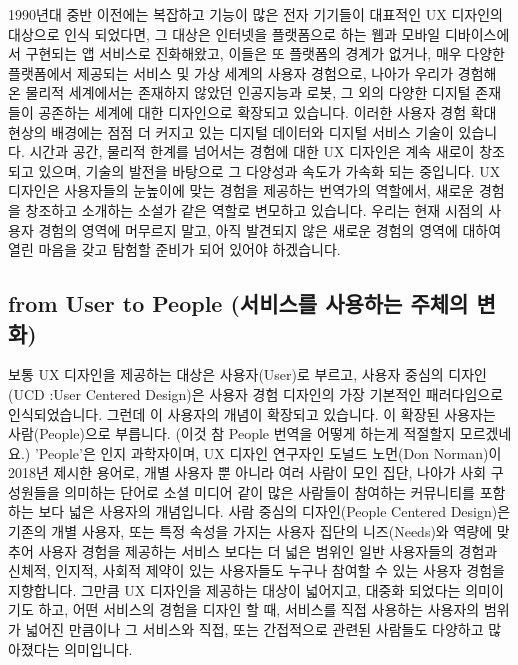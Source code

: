 \documentclass[
  letterpaper,
  DIV=11,
  numbers=noendperiod]{scrreprt}
\begin{document}
1990년대 중반 이전에는 복잡하고 기능이 많은 전자 기기들이 대표적인 UX
디자인의 대상으로 인식 되었다면, 그 대상은 인터넷을 플랫폼으로 하는 웹과
모바일 디바이스에서 구현되는 앱 서비스로 진화해왔고, 이들은 또 플랫폼의
경계가 없거나, 매우 다양한 플랫폼에서 제공되는 서비스 및 가상 세계의
사용자 경험으로, 나아가 우리가 경험해 온 물리적 세계에서는 존재하지
않았던 인공지능과 로봇, 그 외의 다양한 디지털 존재들이 공존하는 세계에
대한 디자인으로 확장되고 있습니다. 이러한 사용자 경험 확대 현상의
배경에는 점점 더 커지고 있는 디지털 데이터와 디지털 서비스 기술이
있습니다. 시간과 공간, 물리적 한계를 넘어서는 경험에 대한 UX 디자인은
계속 새로이 창조되고 있으며, 기술의 발전을 바탕으로 그 다양성과 속도가
가속화 되는 중입니다. UX 디자인은 사용자들의 눈높이에 맞는 경험을
제공하는 번역가의 역할에서, 새로운 경험을 창조하고 소개하는 소설가 같은
역할로 변모하고 있습니다. 우리는 현재 시점의 사용자 경험의 영역에
머무르지 말고, 아직 발견되지 않은 새로운 경험의 영역에 대하여 열린
마음을 갖고 탐험할 준비가 되어 있어야 하겠습니다.

\subsection{from User to People (서비스를 사용하는 주체의
변화)}\label{from-user-to-people-uxc11cuxbe44uxc2a4uxb97c-uxc0acuxc6a9uxd558uxb294-uxc8fcuxccb4uxc758-uxbcc0uxd654}

보통 UX 디자인을 제공하는 대상은 사용자(User)로 부르고, 사용자 중심의
디자인(UCD :User Centered Design)은 사용자 경험 디자인의 가장 기본적인
패러다임으로 인식되었습니다. 그런데 이 사용자의 개념이 확장되고
있습니다. 이 확장된 사용자는 사람(People)으로 부릅니다. (이것 참 People
번역을 어떻게 하는게 적절할지 모르겠네요.) 'People'은 인지 과학자이며,
UX 디자인 연구자인 도널드 노먼(Don Norman)이 2018년 제시한 용어로, 개별
사용자 뿐 아니라 여러 사람이 모인 집단, 나아가 사회 구성원들을 의미하는
단어로 소셜 미디어 같이 많은 사람들이 참여하는 커뮤니티를 포함하는 보다
넓은 사용자의 개념입니다. 사람 중심의 디자인(People Centered Design)은
기존의 개별 사용자, 또는 특정 속성을 가지는 사용자 집단의 니즈(Needs)와
역량에 맞추어 사용자 경험을 제공하는 서비스 보다는 더 넓은 범위인 일반
사용자들의 경험과 신체적, 인지적, 사회적 제약이 있는 사용자들도 누구나
참여할 수 있는 사용자 경험을 지향합니다. 그만큼 UX 디자인을 제공하는
대상이 넓어지고, 대중화 되었다는 의미이기도 하고, 어떤 서비스의 경험을
디자인 할 때, 서비스를 직접 사용하는 사용자의 범위가 넓어진 만큼이나 그
서비스와 직접, 또는 간접적으로 관련된 사람들도 다양하고 많아졌다는
의미입니다.
\end{document}
